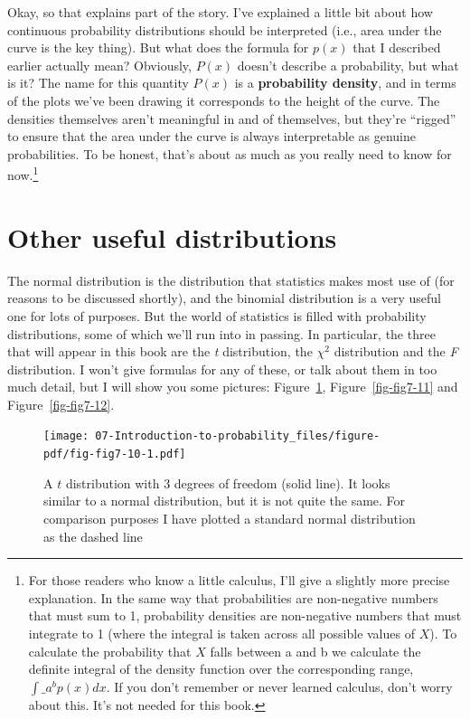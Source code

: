 \documentclass[
  a4paper,
]{book}
\begin{document}
Okay, so that explains part of the story. I've explained a little bit
about how continuous probability distributions should be interpreted
(i.e., area under the curve is the key thing). But what does the formula
for \(p(x)\) that I described earlier actually mean? Obviously, \(P(x)\)
doesn't describe a probability, but what is it? The name for this
quantity \(P(x)\) is a \textbf{probability density}, and in terms of the
plots we've been drawing it corresponds to the height of the curve. The
densities themselves aren't meaningful in and of themselves, but they're
``rigged'' to ensure that the area under the curve is always
interpretable as genuine probabilities. To be honest, that's about as
much as you really need to know for now.\footnote{For those readers who
  know a little calculus, I'll give a slightly more precise explanation.
  In the same way that probabilities are non-negative numbers that must
  sum to 1, probability densities are non-negative numbers that must
  integrate to 1 (where the integral is taken across all possible values
  of \(X\)). To calculate the probability that \(X\) falls between a and
  b we calculate the definite integral of the density function over the
  corresponding range, \(\int\_{a}^{b} p(x) dx\). If you don't remember
  or never learned calculus, don't worry about this. It's not needed for
  this book.}

\hypertarget{sec-Other-useful-distributions}{%
\section{Other useful
distributions}\label{sec-Other-useful-distributions}}

The normal distribution is the distribution that statistics makes most
use of (for reasons to be discussed shortly), and the binomial
distribution is a very useful one for lots of purposes. But the world of
statistics is filled with probability distributions, some of which we'll
run into in passing. In particular, the three that will appear in this
book are the \emph{t} distribution, the \(\chi^2\) distribution and the
\emph{F} distribution. I won't give formulas for any of these, or talk
about them in too much detail, but I will show you some pictures:
Figure~\ref{fig-fig7-10}, Figure~\ref{fig-fig7-11} and
Figure~\ref{fig-fig7-12}.

\begin{figure}

\texttt{[image: 07-Introduction-to-probability\_files/figure-pdf/fig-fig7-10-1.pdf]} \hfill{}

\caption{\label{fig-fig7-10}A \(t\) distribution with 3 degrees of
freedom (solid line). It looks similar to a normal distribution, but it
is not quite the same. For comparison purposes I have plotted a standard
normal distribution as the dashed line}

\end{figure}
\end{document}

